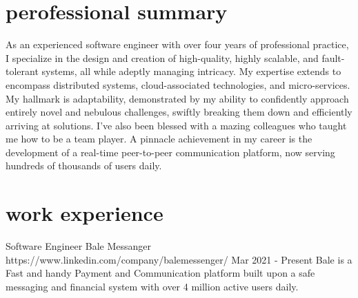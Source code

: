 \documentclass[a4paper,20pt]{article}
\begin{document}
\begin{minipage}[t]{0.65\textwidth}
  \preparetopsec
  \section{perofessional summary}
    \begin{justify}
      \begin{footnotesize}As an experienced software engineer with over four years of professional practice, 
      I specialize in the design and creation of high-quality, highly scalable, 
      and fault-tolerant systems, all while adeptly managing intricacy. My expertise 
      extends to encompass distributed systems, cloud-associated technologies, and 
      micro-services. My hallmark is adaptability, demonstrated by my ability to 
      confidently approach entirely novel and nebulous challenges, swiftly breaking 
      them down and efficiently arriving at solutions. I've also been blessed with a
      mazing colleagues who taught me how to be a team player. A pinnacle achievement 
      in my career is the development of a real-time peer-to-peer communication platform, 
      now serving hundreds of thousands of users daily.
      \end{footnotesize}
    \end{justify}
  \preparenormalsec
  \section{work experience}
  {
    \expheadingwithlink
      {Software Engineer}
      {Bale Messanger}
      {https://www.linkedin.com/company/balemessenger/}
      {Mar 2021 - Present}
      {Bale is a Fast and handy Payment and Communication platform built upon a safe messaging and financial system with over 4 million active users daily.}

}
\end{minipage}
\end{document}

